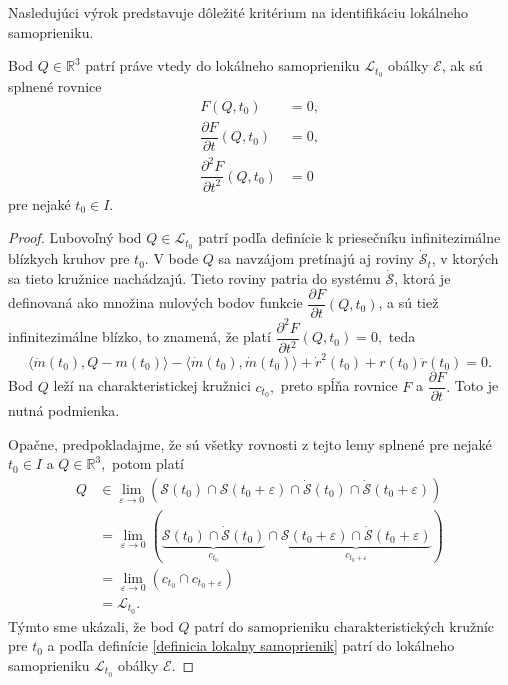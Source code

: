 Nasledujúci výrok predstavuje dôležité kritérium na identifikáciu lokálneho samoprieniku.
\begin{lemma} \label{kriterium o lokalnom samoprieniku}
Bod $Q \in \mathbb{R}^3$ patrí práve vtedy do lokálneho samoprieniku $\mathcal{L}_{t_0}$ obálky $\mathcal{E}$, ak sú splnené rovnice
\begin{align*}
F(Q,t_0) &= 0, \\
\dfrac{\partial F}{\partial t}(Q,t_0) &= 0, \\
\dfrac{\partial^2 F}{\partial t^2}(Q,t_0) &= 0
\end{align*}
pre nejaké $t_0 \in I.$
\end{lemma}

\begin{proof}
Ľubovoľný bod $Q \in \mathcal{L}_{t_0}$ patrí podľa definície k priesečníku infinitezimálne blízkych kruhov pre $t_0$. V bode $Q$ sa navzájom pretínajú aj roviny $\mathcal{\dot{S}}_t$, v ktorých sa tieto kružnice nachádzajú. Tieto roviny patria do systému $\mathcal{\dot{S}}$, ktorá je definovaná ako množina nulových bodov funkcie $\dfrac{\partial F}{\partial t}(Q, t_0)$, a sú tiež infinitezimálne blízko, to znamená, že platí $\dfrac{\partial^2 F}{\partial t^2}(Q,t_0) = 0, $ teda
$$ \langle \ddot{m}(t_0), Q-m(t_0) \rangle - \langle \dot{m}(t_0), \dot{m}(t_0) \rangle + \dot{r}^2(t_0) + r(t_0)\ddot{r}(t_0) = 0. $$
Bod $Q$ leží na charakteristickej kružnici $c_{t_0},$ preto spĺňa rovnice $F $ a $\dfrac{\partial F}{\partial t}.$ Toto je nutná podmienka.

Opačne, predpokladajme, že sú všetky rovnosti z tejto lemy splnené pre nejaké $t_0 \in I$ a $Q \in \mathbb{R}^3, $ potom platí
\begin{align*}
Q &\in \lim_{\varepsilon \to 0} \left( \mathcal{S}(t_0) \cap \mathcal{S}(t_0 + \varepsilon) \cap  \mathcal{\dot{S}}(t_0) \cap  \mathcal{\dot{S}}(t_0 + \varepsilon) \right) \\
&= \lim_{\varepsilon \to 0} \left( \underbrace{\mathcal{S}(t_0) \cap \mathcal{\dot{S}}(t_0)}_{c_{t_0}} \cap \underbrace{\mathcal{S}(t_0 + \varepsilon) \cap \mathcal{\dot{S}}(t_0 + \varepsilon)}_{c_{t_0 + \varepsilon}} \right) \\
&= \lim_{\varepsilon \to 0} \left( {c_{t_0}} \cap {c_{t_0 + \varepsilon}} \right) \\
&= \mathcal{L}_{t_0}.
\end{align*}
Týmto sme ukázali, že bod $Q$ patrí do samoprieniku charakteristických kružníc pre $t_0$ a podľa definície \ref{definicia lokalny samoprienik} patrí do lokálneho samoprieniku $\mathcal{L}_{t_0}$ obálky $\mathcal{E}$.
\end{proof}

